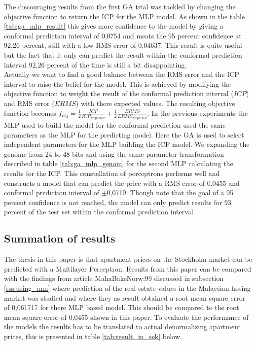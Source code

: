 The discouraging results from the first GA trial was tackled by changing the objective function to return the ICP for the MLP model. As shown in the table \ref{tab:ga_mlp_result} this gives more confidence to the model by giving a conformal prediction interval of 0,0754 and meats the 95 percent confidence at 92,26 percent, still with a low RMS error of 0,04637. This result is quite useful but the fact that it only can predict the result within the conformal prediction interval 92,26 percent of the time is still a bit disappointing.
\\
Actually we want to find a good balance between the RMS error and the ICP interval to raise the belief for the model. This is achieved by modifying the objective function to weight the result of the conformal prediction interval ($ICP$) and RMS error ($ERMS$) with there expected values. The resulting objective function becomes $ f_{obj} = \frac{1}{2}\frac{ICP}{ICP_{Expected}} + \frac{1}{2}\frac{ERMS}{ERMS_{Expected}}$. In the previous experiments the MLP used to build the model for the conformal prediction used the same parameters as the MLP for the predicting model. Here the GA is used to select independent parameters for the MLP building the ICP model. We expanding the genome from 24 to 48 bits and using the same parameter transformation described in table \ref{tab:ga_mlp_genom} for the second MLP calculating the results for the ICP. This constellation of perceptrons performs well and constructs a model that can predict the price with a RMS error of 0,0455 and conformal prediction interval of $\pm$0,0719. Though note that the goal of a 95 percent confidence is not reached, the model can only predict results for 93 percent of the test set within the conformal prediction interval. 

\subsection{Summation of results} \label{sss:result_summup}
The thesis in this paper is that apartment prices on the Stockholm market can be predicted with a Multilayer Perceptron. Results from this paper can be compared with the findings from article \cite{art}{MahaBakeNorw:99} discussed in subsection \ref{sss:using_ann} where prediction of the real estate values in the Malaysian hosing market was studied and where they as result obtained a root mean square error of 0,061717 for there MLP based model. This should be compared to the root mean square error of 0,0455 shown in this paper.
To evaluate the performance of the models the results has to be translated to actual denormalizing apartment prices, this is presented in table \ref{tab:result_in_sek} below. 

